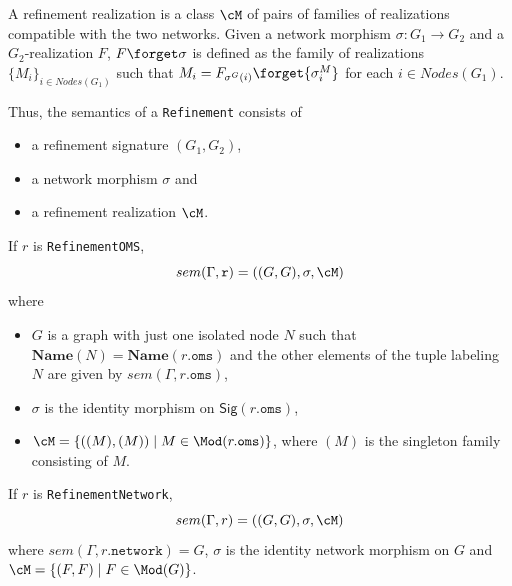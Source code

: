 \documentclass[10pt, a4paper]{isov2}
\newcommand*{\syntax}[1]{\texttt{#1}}
\newcommand{\Sig}{\mathsf{Sig}}
\newcommand{\Name}{\ensuremath{\mathbf{Name}}}
\begin{document}
A refinement realization is a class $\cM$
of pairs of families of realizations compatible with the two networks.
Given a network morphism $\sigma:G_1\to G_2$ and a $G_2$-realization $F$,
 $F\forget\sigma$ is defined as the family of realizations
$\{M_i\}_{i\in Nodes(G_1)}$ such that
$M_i = F_{\sigma^G(i)}\forget{\sigma^M_{i}}$ for each $i\in Nodes(G_1)$.

Thus, the semantics of a \syntax{Refinement} consists of
\begin{itemize}
 \item a refinement signature $(G_1,G_2)$,
 \item a network morphism $\sigma$ and
 \item a refinement realization $\cM$.
\end{itemize}
\medskip

If $r$ is \syntax{RefinementOMS},
$$sem(\Gamma, \syntax{r}) =
   ((G, G), \sigma, \cM) $$
  \noindent where
  \begin{itemize}
  \item $G$ is a graph with just one isolated node $N$
  such that $\Name(N) = \Name(r.\syntax{oms})$
  and the other elements of the tuple labeling
  $N$ are given by $sem(\Gamma,r.\syntax{oms})$,
  \item $\sigma$ is the identity morphism on
  $\Sig(r.\syntax{oms})$,
  \item $\cM = \{((M), (M)) \mid M \in \Mod(r.\syntax{oms})\}$,
   where $(M)$ is the singleton family consisting of $M$.
  \end{itemize}

If $r$ is \syntax{RefinementNetwork},
$$sem(\Gamma, r) = ((G, G), \sigma, \cM)$$
\noindent
where $sem(\Gamma, r.\syntax{network}) = G$,
$\sigma$ is the identity network morphism on $G$
and
$\cM = \{ (F, F) \mid F \in \Mod(G)\}$.
\end{document}
